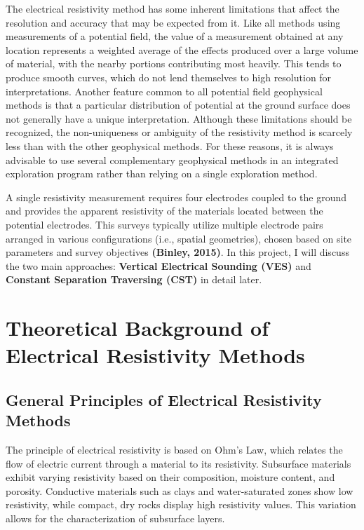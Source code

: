 \documentclass[12pt,a4paper]{report}
\begin{document}
The electrical resistivity method has some inherent limitations that affect the resolution and accuracy that may be expected from it.  Like all methods using measurements of a potential field, the value of a measurement obtained at any location represents a weighted average of the effects produced over a large volume of material, with the nearby portions contributing most heavily.  This tends to produce smooth curves, which do not lend themselves to high resolution for interpretations.  Another feature common to all potential field geophysical methods is that a particular distribution of potential at the ground surface does not generally have a unique interpretation.  Although these limitations should be recognized, the non-uniqueness or ambiguity of the resistivity method is scarcely less than with the other geophysical methods.  For these reasons, it is always advisable to use several complementary geophysical methods in an integrated exploration program rather than relying on a single exploration method.

A single resistivity measurement requires four electrodes coupled to the ground and provides the apparent resistivity of the materials located between the potential electrodes. This surveys typically utilize multiple electrode pairs arranged in various configurations (i.e., spatial geometries), chosen based on site parameters and survey objectives \textbf{(Binley, 2015)}. In this project, I will discuss the two main approaches: \textbf{Vertical Electrical Sounding (VES)} and \textbf{Constant Separation Traversing (CST)} in detail later.

\section{Theoretical Background of Electrical Resistivity Methods}

\subsection{General Principles of Electrical Resistivity Methods}
The principle of electrical resistivity is based on Ohm's Law, which relates the flow of electric current through a material to its resistivity. Subsurface materials exhibit varying resistivity based on their composition, moisture content, and porosity. Conductive materials such as clays and water-saturated zones show low resistivity, while compact, dry rocks display high resistivity values. This variation allows for the characterization of subsurface layers.
\end{document}
